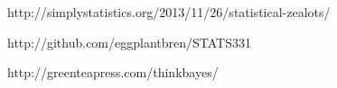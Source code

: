 \documentclass[a4paper, 12pt]{article}
\begin{document}
\begin{thebibliography}{999} %
http://simplystatistics.org/2013/11/26/statistical-zealots/

http://github.com/eggplantbren/STATS331

http://greenteapress.com/thinkbayes/

\end{thebibliography}
\end{document}
